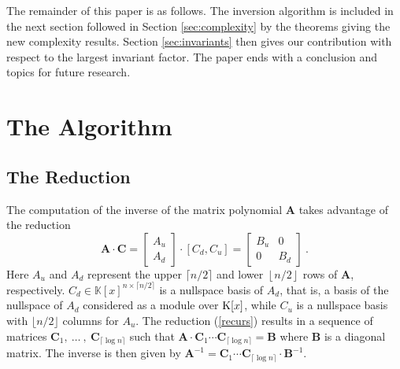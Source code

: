 \documentclass[a4paper,11pt]{article}
\newcommand{\K}{ {\rm K}}
\begin{document}
The remainder of this paper is as follows. The inversion algorithm is included in the next section followed in Section \ref{sec:complexity} by the theorems giving the new complexity results. Section \ref{sec:invariants} then gives our contribution with respect to the largest invariant factor. The paper ends with a conclusion and topics for future research.

\section{The Algorithm}

\subsection{The Reduction}

The computation of the inverse of the matrix polynomial $\mathbf{A}$ takes advantage of the 
reduction
\begin{equation}\label{recurs}
\mathbf{A} \cdot \mathbf{C} = \left[ \begin{array}{c} A_u \\ \hline  A_d \end{array} \right]
 \cdot \left[ C_d , C_u \right] = \left[ \begin{array}{cc} B_u & 0 \\ 0 & B_d \end{array} \right] ~.
\end{equation}
Here $A_u$ and $A_d$ represent the upper $\lceil n/2 \rceil$ and lower $\left\lfloor n/2 \right \rfloor$ rows of $\mathbf{A}$, respectively.  $C_d \in \mathbb{K}\left[x\right]^{n\times \lceil n/2 \rceil }$ is a nullspace basis of $A_d$, that is, a basis of the nullspace of $A_d$ considered as a module over $\K[x]$, 
while $C_u$ is a nullspace basis with $\lfloor n/2 \rfloor$ columns for $A_u$.  The reduction 
(\ref{recurs}) results in a sequence of matrices $\mathbf{C}_1,~\ldots~,~\mathbf{C}_{\lceil \log n \rceil}$ such that
$\mathbf{A} \cdot \mathbf{C}_1 \cdots \mathbf{C}_{\lceil \log n \rceil} = \mathbf{B}$ where $\mathbf{B}$ is a diagonal matrix. The inverse is then given by $\mathbf{A}^{-1} = \mathbf{C}_1 \cdots \mathbf{C}_{\lceil \log n \rceil} \cdot \mathbf{B}^{-1}$.
\end{document}
